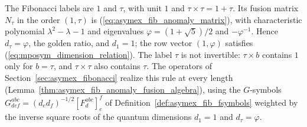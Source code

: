 \begin{example}%
    \label{ex:mposym_fibonacci_dimension}
    \leanok
    The Fibonacci labels are $1$ and $\tau$, with unit $1$ and
    $\tau\times\tau=1+\tau$. Its fusion matrix $N_\tau$ in the order
    $(1,\tau)$ is (\ref{eq:asymex_fib_anomaly_matrix}),
    with characteristic polynomial $\lambda^2-\lambda-1$ and eigenvalues
    $\varphi=(1+\sqrt5)/2$ and $-\varphi^{-1}$. Hence
    $d_\tau=\varphi$, the golden ratio, and $d_1=1$; the row vector
    $(1,\varphi)$ satisfies (\ref{eq:mposym_dimension_relation}). The label
    $\tau$ is not invertible: $\tau\times b$ contains $1$ only for
    $b=\tau$, and $\tau\times\tau$ also contains $\tau$. The operators of
    Section~\ref{sec:asymex_fibonacci} realize this rule at every length
    (Lemma~\ref{thm:asymex_fib_anomaly_fusion_algebra}), using the
    $G$-symbols $G^{abc}_{def}=(d_ed_f)^{-1/2}[F^{abc}_d]_e^f$ of
    Definition~\ref{def:asymex_fib_fsymbols}
    \cite[Appendix~D.1]{Bultinck2017Anyons} weighted by the inverse square
    roots of the quantum dimensions $d_1=1$ and $d_\tau=\varphi$.
\end{example}

